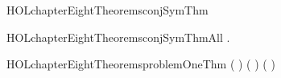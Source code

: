 \newcommand{\HOLchapterEightDate}{25 January 2020}
\newcommand{\HOLchapterEightTime}{13:54}
\begin{SaveVerbatim}{HOLchapterEightTheoremsconjSymThm}
\HOLTokenTurnstile{}  \HOLSymConst{\HOLTokenConj{}}  \HOLSymConst{\HOLTokenEquiv{}}  \HOLSymConst{\HOLTokenConj{}} 
\end{SaveVerbatim}
\newcommand{\HOLchapterEightTheoremsconjSymThm}{\UseVerbatim{HOLchapterEightTheoremsconjSymThm}}
\begin{SaveVerbatim}{HOLchapterEightTheoremsconjSymThmAll}
\HOLTokenTurnstile{} \HOLSymConst{\HOLTokenForall{}} .  \HOLSymConst{\HOLTokenConj{}}  \HOLSymConst{\HOLTokenEquiv{}}  \HOLSymConst{\HOLTokenConj{}} 
\end{SaveVerbatim}
\newcommand{\HOLchapterEightTheoremsconjSymThmAll}{\UseVerbatim{HOLchapterEightTheoremsconjSymThmAll}}
\begin{SaveVerbatim}{HOLchapterEightTheoremsproblemOneThm}
\HOLTokenTurnstile{} ( \HOLSymConst{\HOLTokenImp{}} ) \HOLSymConst{\HOLTokenImp{}} ( \HOLSymConst{\HOLTokenImp{}} ) \HOLSymConst{\HOLTokenImp{}} ( \HOLSymConst{\HOLTokenImp{}} ) \HOLSymConst{\HOLTokenImp{}} 
\end{SaveVerbatim}
\newcommand{\HOLchapterEightTheoremsproblemOneThm}{\UseVerbatim{HOLchapterEightTheoremsproblemOneThm}}
\newcommand{\HOLchapterEightTheorems}{
\HOLThmTag{chapter8}{conjSymThm}\HOLchapterEightTheoremsconjSymThm
\HOLThmTag{chapter8}{conjSymThmAll}\HOLchapterEightTheoremsconjSymThmAll
\HOLThmTag{chapter8}{problem1Thm}\HOLchapterEightTheoremsproblemOneThm
}
